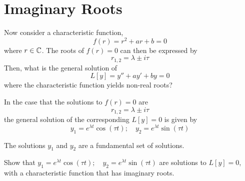 \documentclass[twoside]{report}
\begin{document}
    \section{Imaginary Roots}
    Now consider a characteristic function,
    \begin{equation}
        f(r) = r^{2} + ar + b = 0
    \end{equation}
    where $r \in \mathbb{C}$. The roots of $f(r) = 0$ can then be expressed by
    \begin{equation}
        r_{1,2} = \lambda \pm i\tau
    \end{equation}
    Then, what is the general solution of
    \begin{equation}
        L[y] = y'' + ay' + by = 0
    \end{equation}
    where the characteristic function yields non-real roots?
    \begin{btheorem}
        In the case that the solutions to $f(r) = 0$ are
        \begin{equation}
            r_{1,2} = \lambda \pm i\tau
        \end{equation}
        the general solution of the corresponding $L[y] = 0$ is given by
        \begin{equation}
            y_{1} = e^{\lambda t}\cos(\tau t);\quad y_{2} = e^{\lambda t}\sin(\tau t)
        \end{equation}
        
        The solutions $y_{1}$ and $y_{2}$ are a fundamental set of solutions.
    \end{btheorem}
    \begin{homework}
        Show that $y_{1} = e^{\lambda t}\cos(\tau t);\quad y_{2} = e^{\lambda t}\sin(\tau t)$ are solutions to $L[y] = 0$, with a characteristic function that has imaginary roots.
    \end{homework}
\end{document}
